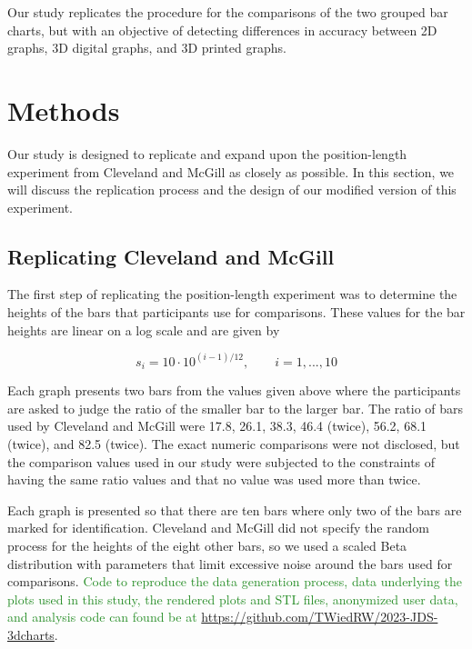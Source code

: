 \documentclass[letterpaper,inpress,dvipsnames]{jdsart}
\begin{document}
Our study replicates the procedure for the comparisons of the two grouped bar charts, but with an objective of detecting differences in accuracy between 2D graphs, 3D digital graphs, and 3D printed graphs.

\hypertarget{methods}{%
\section{Methods}\label{methods}}

Our study is designed to replicate and expand upon the position-length experiment from Cleveland and McGill as closely as possible.
In this section, we will discuss the replication process and the design of our modified version of this experiment.

\hypertarget{replicating-cleveland-and-mcgill}{%
\subsection{Replicating Cleveland and McGill}\label{replicating-cleveland-and-mcgill}}

The first step of replicating the position-length experiment was to determine the heights of the bars that participants use for comparisons.
These values for the bar heights are linear on a log scale and are given by

\[s_i=10\cdot 10^{(i-1)/12}, \qquad i=1,...,10\]

Each graph presents two bars from the values given above where the participants are asked to judge the ratio of the smaller bar to the larger bar. The ratio of bars used by Cleveland and McGill were 17.8, 26.1, 38.3, 46.4 (twice), 56.2, 68.1 (twice), and 82.5 (twice).
The exact numeric comparisons were not disclosed, but the comparison values used in our study were subjected to the constraints of having the same ratio values and that no value was used more than twice.

Each graph is presented so that there are ten bars where only two of the bars are marked for identification.
Cleveland and McGill did not specify the random process for the heights of the eight other bars, so we used a scaled Beta distribution with parameters that limit excessive noise around the bars used for comparisons.
{\textcolor{ForestGreen}{Code to reproduce the data generation process, data underlying the plots used in this study, the rendered plots and STL files, anonymized user data, and analysis code can found be at}} \url{https://github.com/TWiedRW/2023-JDS-3dcharts}.
\end{document}
